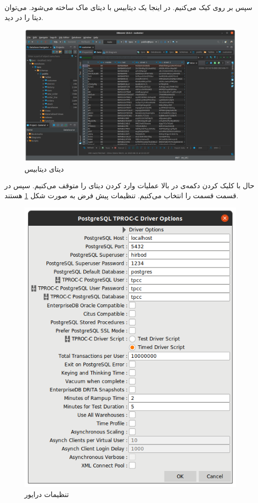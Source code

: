 سپس بر روی
کیک می‌کنیم. در اینجا یک دیتابیس با دیتای ماک ساخته می‌شود. می‌توان دیتا را در
دید.
\begin{figure}[H]
    \centering
    \includegraphics[scale=0.29]{pictures/hammerdb/dbeaver.png}
    \caption{دیتای دیتابیس}
\end{figure}
حال با کلیک کردن دکمه‌ی
در بالا عملیات وارد کردن دیتای
را متوقف می‌کنیم. سپس در قسمت
قسمت
را انتخاب می‌کنیم. تنظیمات پیش فرض به صورت شکل
\ref{fig:hammerdb:init:default_driver}
هستند.
\begin{figure}[H]
    \centering
    \includegraphics[scale=0.5]{pictures/hammerdb/default-driver.png}
    \caption{تنظیمات درایور}
    \label{fig:hammerdb:init:default_driver}
\end{figure}
